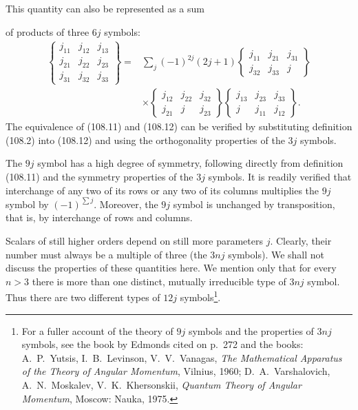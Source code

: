 This quantity can also be represented as a sum

of products of three $6j$ symbols:
\begin{equation}
\begin{aligned}
\left\{\begin{matrix}j_{11}&j_{12}&j_{13}\\j_{21}&j_{22}&j_{23}\\j_{31}&j_{32}&j_{33}\end{matrix}\right\}
={}&\sum_j(-1)^{2j}(2j+1)
\left\{\begin{matrix}j_{11}&j_{21}&j_{31}\\j_{32}&j_{33}&j\end{matrix}\right\}\\
&\times\left\{\begin{matrix}j_{12}&j_{22}&j_{32}\\j_{21}&j&j_{23}\end{matrix}\right\}
\left\{\begin{matrix}j_{13}&j_{23}&j_{33}\\j&j_{11}&j_{12}\end{matrix}\right\}.
\end{aligned}
\tag{108.12}
\end{equation}
The equivalence of (108.11) and (108.12) can be verified by substituting definition (108.2) into (108.12) and using the orthogonality properties of the $3j$ symbols.

The $9j$ symbol has a high degree of symmetry, following directly from definition (108.11) and the symmetry properties of the $3j$ symbols. It is readily verified that interchange of any two of its rows or any two of its columns multiplies the $9j$ symbol by $(-1)^{\sum j}$. Moreover, the $9j$ symbol is unchanged by transposition, that is, by interchange of rows and columns.

Scalars of still higher orders depend on still more parameters $j$. Clearly, their number must always be a multiple of three (the $3nj$ symbols). We shall not discuss the properties of these quantities here. We mention only that for every $n>3$ there is more than one distinct, mutually irreducible type of $3nj$ symbol. Thus there are two different types of $12j$ symbols\footnote{For a fuller account of the theory of $9j$ symbols and the properties of $3nj$ symbols, see the book by Edmonds cited on p.~272 and the books: A.~P.~Yutsis, I.~B.~Levinson, V.~V.~Vanagas, \emph{The Mathematical Apparatus of the Theory of Angular Momentum}, Vilnius, 1960; D.~A.~Varshalovich, A.~N.~Moskalev, V.~K.~Khersonskii, \emph{Quantum Theory of Angular Momentum}, Moscow: Nauka, 1975.}.
